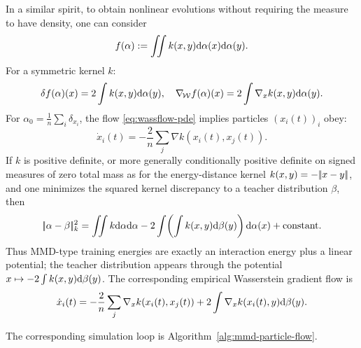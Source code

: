 In a similar spirit, to obtain nonlinear evolutions without requiring the measure to have density, one can consider
   \begin{equation}
       f(\alpha) := \iint k(x, y) \mathrm{d} \alpha(x) \mathrm{d} \alpha(y). \label{eq:quadratic-func}
   \end{equation}
   For a symmetric kernel $k$:
   \begin{equation*}
       \delta f(\alpha)(x) = 2 \int k(x, y) \mathrm{d} \alpha(y), \quad \nabla_{\!\operatorname{\mathcal{W}}} f(\alpha)(x) = 2 \int \nabla_x k(x, y) \mathrm{d} \alpha(y).
   \end{equation*}
   For $\alpha_0 = \frac{1}{n} \sum_i \delta_{x_i}$, the flow \eqref{eq:wassflow-pde} implies particles $(x_i(t))_i$ obey:
   \begin{equation*}
       \dot{x}_i(t) = -\frac{2}{n} \sum_j \nabla k(x_i(t), x_j(t)).
   \end{equation*}
	   If $k$ is positive definite, or more generally conditionally positive definite on signed measures of zero total mass as for the energy-distance kernel $k(x,y)=-|\!| x-y |\!|$, and one minimizes the squared kernel discrepancy to a teacher distribution $\beta$, then
   \[
       |\!| \alpha-\beta |\!|_k^2
       =
       \iint k\mathrm{d}\alpha\mathrm{d}\alpha
       -2\int\!\left(\int k(x,y)\mathrm{d}\beta(y)\right)\mathrm{d}\alpha(x)
       +\mathrm{constant}.
       \]
	       Thus MMD-type training energies are exactly an interaction energy plus a linear potential; the teacher distribution appears through the potential $x\mapsto-2\int k(x,y)\mathrm{d}\beta(y)$. The corresponding empirical Wasserstein gradient flow is
       \[
		\dot x_i(t)
		=
		-\frac{2}{n}\sum_j\nabla_x k(x_i(t),x_j(t))
		+
		2\int\nabla_x k(x_i(t),y)\mathrm{d}\beta(y).
       \]

The corresponding simulation loop is Algorithm~\ref{alg:mmd-particle-flow}.

